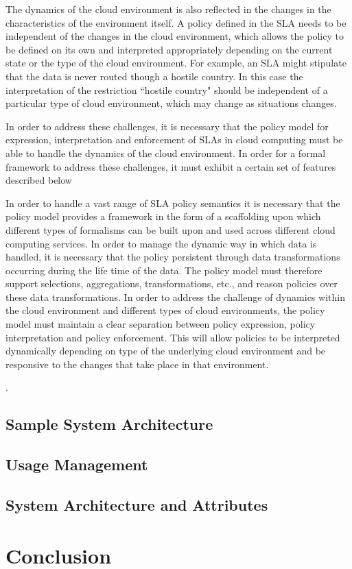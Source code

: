 \documentclass[10pt, conference, compsocconf]{IEEEtran}
\begin{document}
The dynamics of the cloud environment is also reflected in the changes in the characteristics of the environment itself. A policy defined in the SLA needs to be independent of the changes in the cloud environment, which allows the policy to be defined on its own and interpreted appropriately depending on the current state or the type of the cloud environment. For example, an SLA might stipulate that the data is never routed though a hostile country. In this case the interpretation of the restriction ``hostile country" should be independent of a particular type of cloud environment, which may change as situations changes. 

In order to address these challenges, it is necessary that the policy model for expression, interpretation and enforcement of SLAs in cloud computing must be able to handle the dynamics of the cloud environment. In order for a formal framework to address these challenges, it must exhibit a certain set of features described below 

In order to handle a vast range of SLA policy semantics it is necessary that the policy model provides a framework in the form of a scaffolding upon which different types of formalisms can be built upon and used across different cloud computing services. In order to manage the dynamic way in which data is handled, it is necessary that the policy persistent through data transformations occurring during the life time of the data. The policy model must therefore support selections, aggregations, transformations, etc., and reason policies over these data transformations. In order to address the challenge of dynamics within the cloud environment and different types of cloud environments, the policy model must maintain a clear separation between policy expression, policy interpretation and policy enforcement. This will allow policies to be interpreted dynamically depending on type of the underlying cloud environment and be responsive to the changes that take place in that environment.  



\cite{Emr:Web:Jade,Emr:Web:Fipa}.
\cite{KoLaMaMi:04,SaShUe:04}

\subsection{Sample System Architecture}

\subsection{Usage Management}
 

\subsection{System Architecture and Attributes}

\section{Conclusion}



\end{document}
